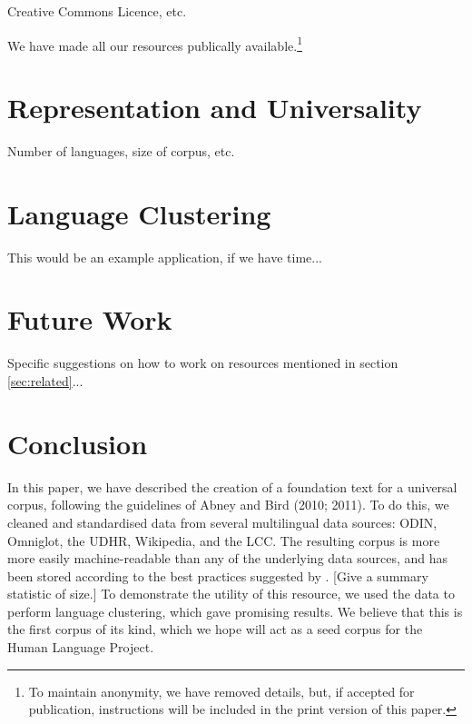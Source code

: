 \documentclass[11pt]{article}
\begin{document}
Creative Commons Licence, etc.

We have made all our resources publically available.\footnote{To maintain anonymity, we have removed details, but, if accepted for publication, instructions will be included in the print version of this paper.}


\section{Representation and Universality} \label{sec:stats}

Number of languages, size of corpus, etc.


\section{Language Clustering} \label{sec:cluster}

This would be an example application, if we have time...


\section{Future Work} \label{sec:future}

Specific suggestions on how to work on resources mentioned in section \ref{sec:related}...


\section{Conclusion} \label{sec:conclusion}

In this paper, we have described the creation of a foundation text for a universal corpus, following the guidelines of Abney and Bird (2010; 2011). To do this, we cleaned and standardised data from several multilingual data sources: ODIN, Omniglot, the UDHR, Wikipedia, and the LCC. The resulting corpus is more more easily machine-readable than any of the underlying data sources, and has been stored according to the best practices suggested by . [Give a summary statistic of size.] To demonstrate the utility of this resource, we used the data to perform language clustering, which gave promising results. We believe that this is the first corpus of its kind, which we hope will act as a seed corpus for the Human Language Project.



\end{document}
